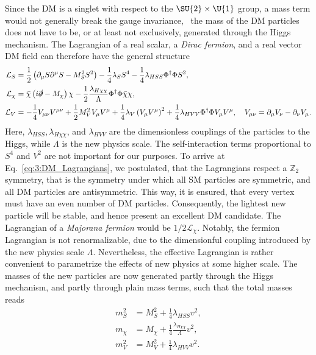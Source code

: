 Since the \acs{DM} is a singlet with respect to the $\SU{2} \times \U{1}$ group, a mass term would not generally break the gauge invariance, \ie\ the mass of the \acs{DM} particles does not have to be, or at least not exclusively, generated through the Higgs mechanism. The Lagrangian of a real scalar, a \textit{Dirac fermion}, and a real vector \acs{DM} field can therefore have the general structure
\begin{equation}
\begin{split}
\mathcal{L}_S &= \frac{1}{2} \left(\partial_\mu S \partial^\mu S - M_S^2 S^2 \right)  - \frac{1}{4} \lambda_S S^4 - \frac{1}{4} \lambda_{HSS} \Phi^\dagger \Phi S^2 , \\
\mathcal{L}_\chi &=  \bar{\chi} \left(i \slashed{\partial} - M_\chi \right) \chi - \frac{1}{2} \frac{\lambda_{H\chi \chi}}{\Lambda} \Phi^\dagger \Phi \bar{\chi} \chi, \\
\mathcal{L}_V &=  - \frac{1}{4} V_{\mu \nu} V^{\mu \nu} + \frac{1}{2} M_V^2 V_\mu V^\mu + \frac{1}{4} \lambda_V \left(V_\mu V^\mu \right)^2 + \frac{1}{4} \lambda_{HVV} \Phi^\dagger \Phi V_\mu V^\mu, \quad V_{\mu \nu} = \partial_\mu V_\nu - \partial_\nu V_\mu.
\end{split}
\label{eq:3:DM_Lagrangians}
\end{equation}
Here, $\lambda_{HSS}, \lambda_{H\chi\chi}$, and $\lambda_{HVV}$ are the dimensionless couplings of the particles to the Higgs, while $\Lambda$ is the new physics scale. The self-interaction terms proportional to $S^4$ and $V^2$ are not important for our purposes. To arrive at Eq.~\eqref{eq:3:DM_Lagrangians}, we postulated, that the Lagrangians respect a $\mathbb{Z}_2$ symmetry, that is the symmetry under which all \acs{SM} particles are symmetric, and all \acs{DM} particles are antisymmetric. This way, it is ensured, that every vertex must have an even number of \acs{DM} particles. Consequently, the lightest new particle will be stable, and hence present an excellent \acs{DM} candidate. The Lagrangian of a \textit{Majorana fermion} would be $1/2 \mathcal{L}_\chi$. Notably, the fermion Lagrangian is not renormalizable, due to the dimensionful coupling introduced by the new physics scale $\Lambda$. Nevertheless, the effective Lagrangian is rather convenient to parametrize the effects of new physics at some higher scale. The masses of the new particles are now generated partly through the Higgs mechanism, and partly through plain mass terms, such that the total masses reads
\begin{equation}
\begin{split}
m_S^2 &= M_S^2 + \frac{1}{4} \lambda_{HSS} v^2, \\
m_\chi &= M_\chi + \frac{1}{4} \frac{\lambda_{H\chi\chi}}{\Lambda} v^2, \\
m_V^2 &= M_V^2 + \frac{1}{4} \lambda_{HVV} v^2.
\end{split}
\end{equation}

